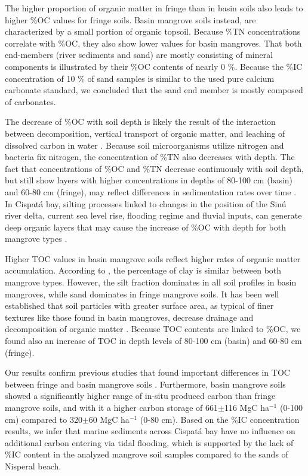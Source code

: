 The higher proportion of organic matter in fringe than in basin soils also leads to higher \%OC values for fringe soils. Basin mangrove soils instead, are characterized by a small portion of organic topsoil. Because \%TN concentrations correlate with \%OC, they also show lower values for basin mangroves. That both end-members (river sediments and sand) are mostly consisting of mineral components is illustrated by their \%OC contents of nearly 0 \%. Because the \%IC concentration of 10 \% of sand samples is similar to the used pure calcium carbonate standard, we concluded that the sand end member is mostly composed of carbonates.

The decrease of \%OC with soil depth is likely the result of the interaction between decomposition, vertical transport of organic matter, and leaching of dissolved carbon in water \citep{Elzein1995, Braakhekke2013, Mathieu2015}. Because soil microorganisms utilize nitrogen and bacteria fix nitrogen, the concentration of \%TN also decreases with depth. The fact that concentrations of \%OC and \%TN decrease continuously with soil depth, but still show layers with higher concentrations in depths of 80-100 cm (basin) and 60-80 cm (fringe), may reflect differences in sedimentation rates over time \citep{Bolivar2015}. In Cispat\'{a} bay, silting processes linked to changes in the position of the Sin\'{u} river delta, current sea level rise, flooding regime and fluvial inputs, can generate deep organic layers that may cause the increase of \%OC with depth for both mangrove types \citep{suarez2004}. 

Higher TOC values in basin mangrove soils reflect higher rates of organic matter accumulation. According to  \citet{Bolivar2015}, the percentage of clay is similar between both mangrove types. However, the silt fraction dominates in all soil profiles in basin mangroves, while sand dominates in fringe mangrove soils. It has been well established that soil particles with greater surface area, as typical of finer textures like those found in basin mangroves, decrease drainage and decomposition of organic matter \citep{prasad2008}. Because TOC contents are linked to \%OC, we found also an increase of TOC in depth levels of 80-100 cm (basin) and 60-80 cm (fringe).

Our results confirm previous studies that found important differences in TOC between fringe and basin mangrove soils \citep{Bolivar2015}. Furthermore, basin mangrove soils showed a significantly higher range of in-situ produced carbon than fringe mangrove soils, and with it a higher carbon storage of 661$\pm$116 MgC ha$^{-1}$ (0-100 cm) compared to 320$\pm$60 MgC ha$^{-1}$ (0-80 cm). Based on the \%IC concentration results, we infer that marine sediments across Cispat\'{a} bay have no influence on additional carbon entering via tidal flooding, which is supported by the lack of \%IC content in the analyzed mangrove soil samples compared to the sands of Nisperal beach.

